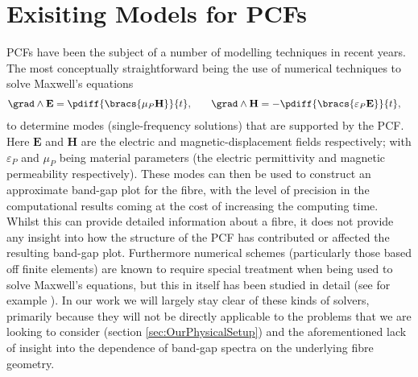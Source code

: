 \section{Exisiting Models for PCFs} \label{sec:ExistingPCFModels}
PCFs have been the subject of a number of modelling techniques in recent years. 
The most conceptually straightforward being the use of numerical techniques to solve Maxwell's equations
\begin{align} \label{eq:MaxwellSystem}
	\grad\wedge\mathbf{E} &= \pdiff{\bracs{\mu_{P}\mathbf{H}}}{t}, 
	&\quad \grad\wedge\mathbf{H} &= -\pdiff{\bracs{\varepsilon_{P}\mathbf{E}}}{t},	
\end{align} 
to determine modes (single-frequency solutions) that are supported by the PCF.
Here $\mathbf{E}$ and $\mathbf{H}$ are the electric and magnetic-displacement fields respectively; with $\varepsilon_{P}$ and $\mu_{P}$ being material parameters (the electric permittivity and magnetic permeability respectively).
These modes can then be used to construct an approximate band-gap plot for the fibre, with the level of precision in the computational results coming at the cost of increasing the computing time.
Whilst this can provide detailed information about a fibre, it does not provide any insight into how the structure of the PCF has contributed or affected the resulting band-gap plot.
Furthermore numerical schemes (particularly those based off finite elements) are known to require special treatment when being used to solve Maxwell's equations, but this in itself has been studied in detail (see for example \cite{monk2003finite}).
In our work we will largely stay clear of these kinds of solvers, primarily because they will not be directly applicable to the problems that we are looking to consider (section \ref{sec:OurPhysicalSetup}) and the aforementioned lack of insight into the dependence of band-gap spectra on the underlying fibre geometry. \newline

